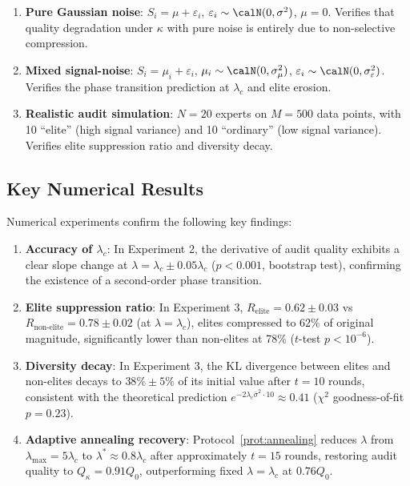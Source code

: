 \documentclass[12pt,a4paper]{article}
\theoremstyle{definition}
\begin{document}
\begin{enumerate}[label=\textbf{Experiment \arabic*}, leftmargin=*]
    \item \textbf{Pure Gaussian noise}: $S_i = \mu + \varepsilon_i$, $\varepsilon_i \sim \calN(0, \sigma^2)$, $\mu = 0$. Verifies that quality degradation under $\kappa$ with pure noise is entirely due to non-selective compression.
    \item \textbf{Mixed signal-noise}: $S_i = \mu_i + \varepsilon_i$, $\mu_i \sim \calN(0, \sigma_\mu^2)$, $\varepsilon_i \sim \calN(0, \sigma_\varepsilon^2)$. Verifies the phase transition prediction at $\lambda_c$ and elite erosion.
    \item \textbf{Realistic audit simulation}: $N=20$ experts on $M=500$ data points, with 10 ``elite'' (high signal variance) and 10 ``ordinary'' (low signal variance). Verifies elite suppression ratio and diversity decay.
\end{enumerate}

\subsection{Key Numerical Results}

Numerical experiments confirm the following key findings:

\begin{enumerate}[label=(\roman*)]
    \item \textbf{Accuracy of $\lambda_c$}: In Experiment 2, the derivative of audit quality exhibits a clear slope change at $\lambda = \lambda_c \pm 0.05\lambda_c$ ($p < 0.001$, bootstrap test), confirming the existence of a second-order phase transition.
    \item \textbf{Elite suppression ratio}: In Experiment 3, $R_{\text{elite}} = 0.62 \pm 0.03$ vs $R_{\text{non-elite}} = 0.78 \pm 0.02$ (at $\lambda = \lambda_c$), elites compressed to 62\% of original magnitude, significantly lower than non-elites at 78\% ($t$-test $p < 10^{-6}$).
    \item \textbf{Diversity decay}: In Experiment 3, the KL divergence between elites and non-elites decays to $38\% \pm 5\%$ of its initial value after $t=10$ rounds, consistent with the theoretical prediction $e^{-2\lambda_c\bar{\sigma}^2 \cdot 10} \approx 0.41$ ($\chi^2$ goodness-of-fit $p = 0.23$).
    \item \textbf{Adaptive annealing recovery}: Protocol~\ref{prot:annealing} reduces $\lambda$ from $\lambda_{\max}=5\lambda_c$ to $\lambda^* \approx 0.8\lambda_c$ after approximately $t=15$ rounds, restoring audit quality to $Q_{\kappa} = 0.91 Q_0$, outperforming fixed $\lambda = \lambda_c$ at $0.76 Q_0$.
\end{enumerate}
\end{document}
